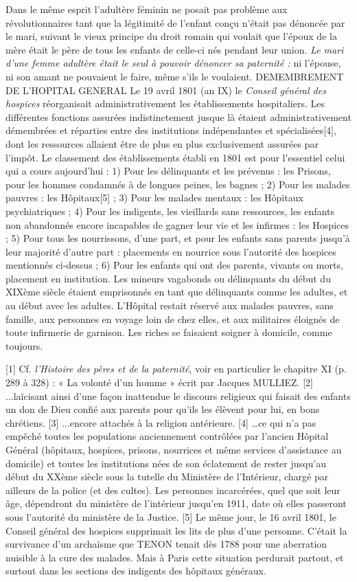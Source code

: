  Dans le même esprit l'adultère féminin ne posait pas problème aux révolutionnaires tant que la légitimité de l'enfant conçu n'était pas dénoncée par le mari, suivant le vieux principe du droit romain qui voulait que l'époux de la mère était le père de tous les enfants de celle-ci nés pendant leur union.\emph{ Le mari d'une femme adultère était le seul à pouvoir dénoncer sa paternité :} ni l'épouse, ni son amant ne pouvaient le faire, même s'ils le voulaient. 
DEMEMBREMENT DE L'HOPITAL GENERAL 
 Le 19 avril 1801 (an IX) le \emph{Conseil général des hospices} réorganisait administrativement les établissements hospitaliers. Les différentes fonctions assurées indistinctement jusque là étaient administrativement démembrées et réparties entre des institutions indépendantes et spécialisées[4], dont les ressources allaient être de plus en plus exclusivement assurées par l'impôt. 
 Le classement des établissements établi en 1801 est pour l'essentiel celui qui a cours aujourd'hui : 1) Pour les délinquants et les prévenus : les Prisons, pour les hommes condamnés à de longues peines, les bagnes ; 2) Pour les malades pauvres : les Hôpitaux[5] ; 3) Pour les malades mentaux : les Hôpitaux psychiatriques ; 4) Pour les indigents, les vieillards sans ressources, les enfants non abandonnés encore incapables de gagner leur vie et les infirmes : les Hospices ; 5) Pour tous les nourrissons, d'une part, et pour les enfants sans parents jusqu'à leur majorité d'autre part : placements en nourrice sous l'autorité des hospices mentionnés ci-dessus ; 6) Pour les enfants qui ont des parents, vivants ou morts, placement en institution.
 Les mineurs vagabonds ou délinquants du début du XIXème siècle étaient emprisonnés en tant que délinquants comme les adultes, et au début avec les adultes. 
 L'Hôpital restait réservé aux malades pauvres, sans famille, aux personnes en voyage loin de chez elles, et aux militaires éloignés de toute infirmerie de garnison. Les riches se faisaient soigner à domicile, comme toujours. 
 
[1] Cf. \emph{l'Histoire des pères et de la paternité}, voir en particulier le chapitre XI (p. 289 à 328) : « La volonté d'un homme » écrit par Jacques MULLIEZ.
[2] ...laïcisant ainsi d'une façon inattendue le discours religieux qui faisait des enfants un don de Dieu confié aux parents pour qu'ils les élèvent pour lui, en bons chrétiens.
[3] ...encore attachés à la religion antérieure.
[4] …ce qui n'a pas empêché toutes les populations anciennement contrôlées par l'ancien Hôpital Général (hôpitaux, hospices, prisons, nourrices et même services d'assistance au domicile) et toutes les institutions nées de son éclatement de rester jusqu'au début du XXème siècle sous la tutelle du Ministère de l'Intérieur, chargé par ailleurs de la police (et des cultes). Les personnes incarcérées, quel que soit leur âge, dépendront du ministère de l'intérieur jusqu'en 1911, date où elles passeront sous l'autorité du ministère de la Justice.
[5] Le même jour, le 16 avril 1801, le Conseil général des hospices supprimait les lits de plus d'une personne. C'était la survivance d'un archaïsme que TENON tenait dès 1788 pour une aberration nuisible à la cure des malades. Mais à Paris cette situation perdurait partout, et surtout dans les sections des indigents des hôpitaux généraux.